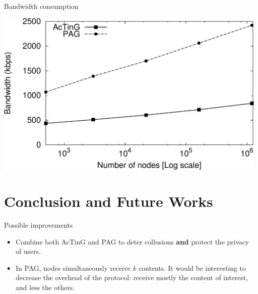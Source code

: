\documentclass[10pt]{beamer}
\begin{document}
\begin{frame}{Bandwidth consumption}{}
   \begin{center}
      \includegraphics[height=.55\textheight]{fig/PAG/scalability}
   \end{center}
\end{frame}


\section{Conclusion and Future Works}


\begin{frame}{Possible improvements}{}
\begin{itemize}
   \item Combine both AcTinG and PAG to deter collusions \textbf{and} protect the privacy of users.
   \item In PAG, nodes simultaneously receive $k$ contents. It would be interesting to decrease the overhead of the protocol: receive mostly the content of interest, and less the others.
\end{itemize}
\end{frame}


{\2
\begin{frame}
\end{frame}}
\end{document}
